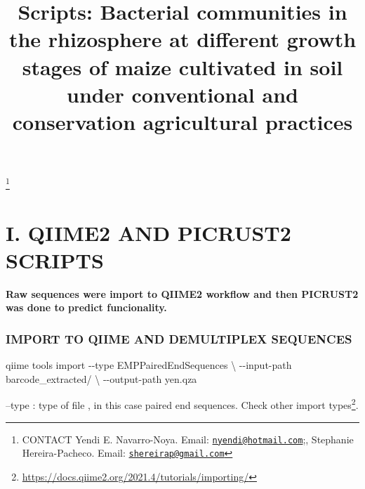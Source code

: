\documentclass[]{interact}
\theoremstyle{plain}%
\theoremstyle{definition}
\theoremstyle{remark}
\newenvironment{Shaded}{\begin{snugshade}}{\end{snugshade}}
\newcommand{\AttributeTok}[1]{\textcolor[rgb]{0.77,0.63,0.00}{#1}}
\newcommand{\DataTypeTok}[1]{\textcolor[rgb]{0.13,0.29,0.53}{#1}}
\newcommand{\ExtensionTok}[1]{#1}
\newcommand{\NormalTok}[1]{#1}
\begin{document}

\title{Scripts: Bacterial communities in the rhizosphere at different
growth stages of maize cultivated in soil under conventional and
conservation agricultural practices}


\author{
}

\thanks{CONTACT Yendi E.
Navarro-Noya. Email: \href{mailto:nyendi@hotmail.com}{\nolinkurl{nyendi@hotmail.com}};, Stephanie
Hereira-Pacheco. Email: \href{mailto:shereirap@gmail.com}{\nolinkurl{shereirap@gmail.com}}}

\maketitle



\hypertarget{i.-qiime2-and-picrust2-scripts}{%
\section{I. QIIME2 AND PICRUST2
SCRIPTS}\label{i.-qiime2-and-picrust2-scripts}}

\textbf{Raw sequences were import to QIIME2 \citep{bolyen2019} workflow
and then PICRUST2 \citep{douglas2020} was done to predict funcionality.}

\hypertarget{import-to-qiime-and-demultiplex-sequences}{%
\subsubsection{IMPORT TO QIIME AND DEMULTIPLEX
SEQUENCES}\label{import-to-qiime-and-demultiplex-sequences}}

\begin{Shaded}
\begin{Highlighting}[]
\ExtensionTok{qiime}\NormalTok{ tools import }\AttributeTok{{-}{-}type}\NormalTok{ EMPPairedEndSequences }\DataTypeTok{\textbackslash{}}
\NormalTok{{-}{-}input{-}path barcode\_extracted/ }\DataTypeTok{\textbackslash{}}
\NormalTok{{-}{-}output{-}path yen.qza}
\end{Highlighting}
\end{Shaded}

--type : type of file , in this case paired end sequences. Check other
import types\footnote{\url{https://docs.qiime2.org/2021.4/tutorials/importing/}}.
\end{document}
